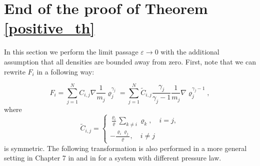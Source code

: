 \documentclass[11pt]{article}
\numberwithin{equation}{section}
\numberwithin{tw}{section}
\begin{document}
\section{End of the proof of Theorem \ref{positive_th}}\label{limit_sect}

In this section we perform the limit passage $\varepsilon\to 0$ with the additional assumption that all densities are bounded away from zero. First, note that we can rewrite $F_i$ in a following way:

\[ F_i = \sum_{j=1}^N C_{i,j}\nabla\frac{1}{m_j}\varrho_j^{\gamma_j} = \sum_{j=1}^N\tilde C_{i,j}\frac{\gamma_j}{\gamma_j-1}\frac{1}{m_j}\nabla\varrho_j^{\gamma_j-1}, \]
where
\[ \tilde C_{i,j} = \left\{ \begin{aligned}
    \frac{\varrho_i}{\varrho}\sum_{k\neq i}\varrho_k, \quad i=j, \\
    -\frac{\varrho_i\varrho_j}{\varrho}, \quad i\neq j
\end{aligned}\right.\]
is symmetric. The following transformation is also performed in a more general setting in Chapter 7 in \cite{giovangigli} and in \cite{DDGG} for a system with different pressure law.

\end{document}
